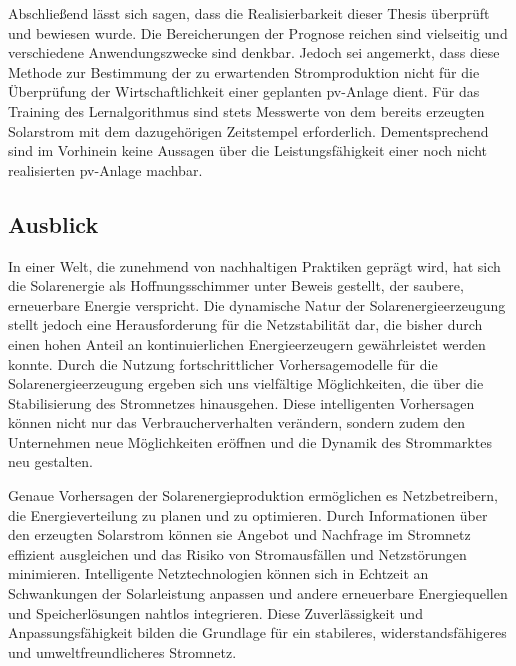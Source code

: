 \documentclass[12pt, a4paper]{article}
\begin{document}
Abschließend lässt sich sagen, dass die Realisierbarkeit dieser Thesis überprüft und bewiesen wurde. Die Bereicherungen der Prognose reichen sind vielseitig und verschiedene Anwendungszwecke sind denkbar. Jedoch sei angemerkt, dass diese Methode zur Bestimmung der zu erwartenden Stromproduktion nicht für die Überprüfung der Wirtschaftlichkeit einer geplanten \ac{pv}-Anlage dient. Für das Training des Lernalgorithmus sind stets Messwerte von dem bereits erzeugten Solarstrom mit dem dazugehörigen Zeitstempel erforderlich. Dementsprechend sind im Vorhinein keine Aussagen über die Leistungsfähigkeit einer noch nicht realisierten \ac{pv}-Anlage machbar.

\newpage

\subsection{Ausblick}
\label{subsec:outlook}

In einer Welt, die zunehmend von nachhaltigen Praktiken geprägt wird, hat sich die Solarenergie als Hoffnungsschimmer unter Beweis gestellt, der saubere, erneuerbare Energie verspricht. Die dynamische Natur der Solarenergieerzeugung stellt jedoch eine Herausforderung für die Netzstabilität dar, die bisher durch einen hohen Anteil an kontinuierlichen Energieerzeugern gewährleistet werden konnte. Durch die Nutzung fortschrittlicher Vorhersagemodelle für die Solarenergieerzeugung ergeben sich uns vielfältige Möglichkeiten, die über die Stabilisierung des Stromnetzes hinausgehen. Diese intelligenten Vorhersagen können nicht nur das Verbraucherverhalten verändern, sondern zudem den Unternehmen neue Möglichkeiten eröffnen und die Dynamik des Strommarktes neu gestalten.

Genaue Vorhersagen der Solarenergieproduktion ermöglichen es Netzbetreibern, die Energieverteilung zu planen und zu optimieren. Durch Informationen über den erzeugten Solarstrom können sie Angebot und Nachfrage im Stromnetz effizient ausgleichen und das Risiko von Stromausfällen und Netzstörungen minimieren. Intelligente Netztechnologien können sich in Echtzeit an Schwankungen der Solarleistung anpassen und andere erneuerbare Energiequellen und Speicherlösungen nahtlos integrieren. Diese Zuverlässigkeit und Anpassungsfähigkeit bilden die Grundlage für ein stabileres, widerstandsfähigeres und umweltfreundlicheres Stromnetz.
\end{document}
